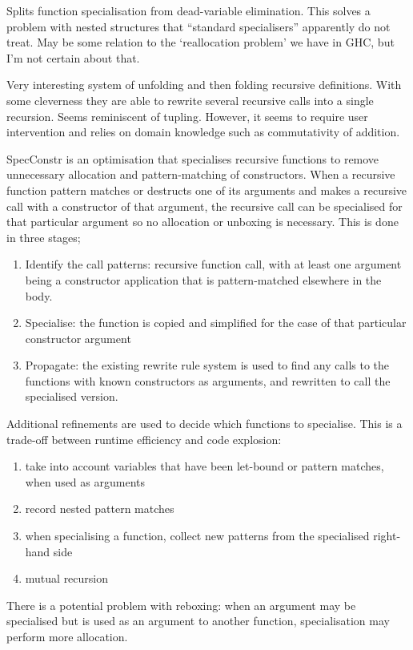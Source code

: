 
Splits function specialisation from dead-variable elimination.
This solves a problem with nested structures that ``standard specialisers'' apparently do not treat.
May be some relation to the `reallocation problem' we have in GHC, but I'm not certain about that.



Very interesting system of unfolding and then folding recursive definitions.
With some cleverness they are able to rewrite several recursive calls into a single recursion.
Seems reminiscent of tupling.
However, it seems to require user intervention and relies on domain knowledge such as commutativity of addition.


SpecConstr is an optimisation that specialises recursive functions to remove unnecessary allocation and pattern-matching of constructors.
When a recursive function pattern matches or destructs one of its arguments and makes a recursive call with a constructor of that argument,
the recursive call can be specialised for that particular argument so no allocation or unboxing is necessary.
This is done in three stages;
\begin{enumerate}
\item
Identify the call patterns: recursive function call, with at least one argument being a constructor application that is pattern-matched elsewhere in the body.
\item
Specialise: the function is copied and simplified for the case of that particular constructor argument
\item
Propagate: the existing rewrite rule system is used to find any calls to the functions with known constructors as arguments, and rewritten to call the specialised version.
\end{enumerate}
Additional refinements are used to decide which functions to specialise. This is a trade-off between runtime efficiency and code explosion:
\begin{enumerate}
\item
 take into account variables that have been let-bound or pattern matches, when used as arguments
\item
 record nested pattern matches
\item
 when specialising a function, collect new patterns from the specialised right-hand side
\item
 mutual recursion
\end{enumerate}
There is a potential problem with reboxing: when an argument may be specialised but is used as an argument to another function, specialisation may perform more allocation.




